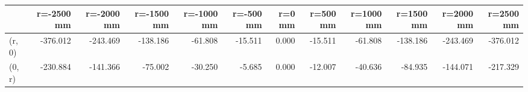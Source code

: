 \documentclass[convert={convertexe={magick.exe}}]{standalone}
\begin{document}
\begin{tabular}{lrrrrrrrrrrr}
\toprule
{} &  r=-2500 mm &  r=-2000 mm &  r=-1500 mm &  r=-1000 mm &  r=-500 mm &  r=0 mm &  r=500 mm &  r=1000 mm &  r=1500 mm &  r=2000 mm &  r=2500 mm \\
\midrule
(r, 0) &    -376.012 &    -243.469 &    -138.186 &     -61.808 &    -15.511 &   0.000 &   -15.511 &    -61.808 &   -138.186 &   -243.469 &   -376.012 \\
(0, r) &    -230.884 &    -141.366 &     -75.002 &     -30.250 &     -5.685 &   0.000 &   -12.007 &    -40.636 &    -84.935 &   -144.071 &   -217.329 \\
\bottomrule
\end{tabular}
\end{document}
